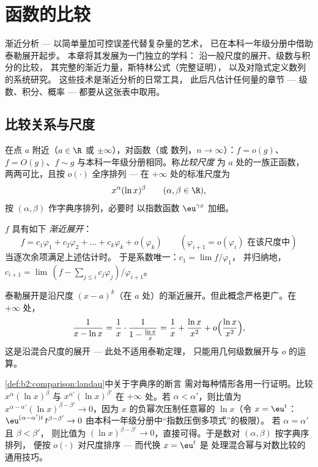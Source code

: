 \chapter{函数的比较}\label{ch:b2:comparison}

渐近分析 --- 以简单量加可控误差代替复杂量的艺术，
已在本科一年级分册中借助泰勒展开起步。
本章将其发展为一门独立的学科：
沿一般尺度的展开、级数与积分的比较，
其完整的渐近力量，斯特林公式（完整证明），
以及对隐式定义数列的系统研究。
这些技术是渐近分析的日常工具，
此后凡估计任何量的章节 ---
级数、积分、概率 --- 都要从这张表中取用。

\section{比较关系与尺度}

\begin{definition}\label{def:b2:comparison:landau}
在点 $a$ 附近（$a \in \R$ 或 $\pm\infty$），对函数（或
数列，$n \to \infty$）：$f = o(g)$、$f = O(g)$、$f \sim g$
与本科一年级分册相同。称\emph{比较尺度}
为 $a$ 处的一族正函数，
两两可比，且按 $o(\cdot)$ 全序排列 ---
在 $+\infty$ 处的标准尺度为
\[
x^{\alpha} (\ln x)^{\beta}
\qquad (\alpha, \beta \in \R),
\]
按 $(\alpha, \beta)$ 作字典序排列，必要时
以指数函数 $\eu^{\gamma x}$ 加细。
\end{definition}

\begin{definition}[渐近展开]\label{def:b2:comparison:expansion}
$f$ 具有如下
\emph{渐近展开}：
\[
f = c_1 \varphi_1 + c_2\varphi_2 + \dots + c_k \varphi_k +
o(\varphi_k)
\qquad (\varphi_{i+1} = o(\varphi_i) \text{ 在该尺度中})
\]
当逐次余项满足上述估计时。
于是系数唯一：$c_1 = \lim f/\varphi_1$，
并归纳地，$c_{i+1} = \lim\,(f - \sum_{j \leq i}
c_j\varphi_j)/\varphi_{i+1}$。
\end{definition}

\begin{example}
泰勒展开是沿尺度 $(x -
a)^k$（在 $a$ 处）的渐近展开。但此概念严格更广。在 $+\infty$ 处，
\[
\frac{1}{x - \ln x}
= \frac1x \cdot \frac{1}{1 - \frac{\ln x}{x}}
= \frac1x + \frac{\ln x}{x^2} + o\Bigl(\frac{\ln x}{x^2}\Bigr),
\]
这是沿混合尺度的展开 --- 此处不适用泰勒定理，
只能用几何级数展开与 $o$ 的运算。
\end{example}

\begin{example}[标准尺度确实有序]\label{ex:b2:comparison:scaleorder}
\cref{def:b2:comparison:landau}中关于字典序的断言
需对每种情形各用一行证明。比较
$x^{\alpha}(\ln x)^{\beta}$ 与 $x^{\alpha'}(\ln x)^{\beta'}$
在 $+\infty$ 处。若 $\alpha < \alpha'$，则比值为
$x^{\alpha - \alpha'}(\ln x)^{\beta - \beta'} \to 0$，因为
$x$ 的负幂次压制任意幂的 $\ln x$（令 $x =
\eu^t$：$\eu^{(\alpha - \alpha')t}\,t^{\beta - \beta'} \to 0$
由本科一年级分册中“指数压倒多项式”的极限）。
若 $\alpha = \alpha'$ 且 $\beta < \beta'$，
则比值为 $(\ln x)^{\beta - \beta'} \to 0$，直接可得。于是数对
$(\alpha, \beta)$ 按字典序排列，
便按 $o(\cdot)$ 对尺度排序 --- 而代换 $x = \eu^t$ 是
处理混合幂与对数比较的通用技巧。
\end{example}

